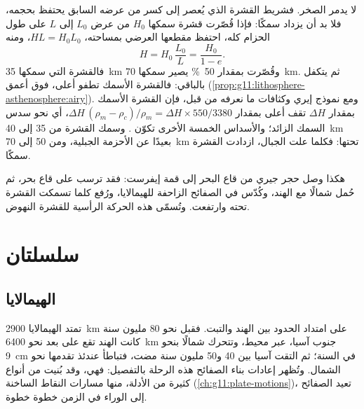  لا يدمر الصخر. فشريط القشرة الذي يُعصر إلى كسر من
عرضه السابق يحتفظ بحجمه، فلا بد أن يزداد سمكًا: فإذا قُصّرت قشرة
سمكها $H_0$ من عرض $L_0$ إلى $L$ على طول الحزام
كله، احتفظ مقطعها العرضي بمساحته، $H L = H_0 L_0$، ومنه
\[
  H = H_0\,\frac{L_0}{L} = \frac{H_0}{1 - e}.
\]
فالقشرة التي سمكها \qty{35}{km} وقُصّرت بمقدار \qty{50}{\percent} يصير
سمكها \qty{70}{km}. ثم يتكفل  بالباقي: فالقشرة الأسمك تطفو
أعلى، فوق  أعمق (\cref{prop:g11:lithosphere-asthenosphere:airy}).
ومع نموذج إيري وكثافات ما نعرفه من قبل، فإن القشرة الأسمك بمقدار
$\Delta H$ تقف أعلى بمقدار $\Delta H\,(\rho_m - \rho_c)/\rho_m = \Delta H
\times 550/3380$، أي نحو سدس السمك الزائد؛ والأسداس الخمسة
الأخرى تكوّن . وسمك القشرة من \num{35} إلى \qty{40}{km} بعيدًا عن
الأحزمة الجبلية، ومن 50 إلى \qty{70}{km} تحتها: فكلما علت
الجبال، ازدادت القشرة سمكًا.

هكذا وصل حجر جيري من قاع البحر إلى قمة إيفرست: فقد ترسب على
قاع بحر، ثم حُمل شمالًا مع الهند، وكُدّس في الصفائح
الزاحفة للهيمالايا، ورُفع كلما تسمكت القشرة تحته
وارتفعت. وتُسمّى هذه الحركة الرأسية للقشرة النهوض.

\section{سلسلتان}

\subsection{الهيمالايا}

تمتد الهيمالايا \qty{2900}{km} على امتداد الحدود بين الهند
والتبت. فقبل نحو 80 مليون سنة كانت الهند تقع على بعد نحو \qty{6400}{km} جنوب
آسيا، عبر محيط، وتتحرك شمالًا بنحو \qty{9}{cm} في السنة؛ ثم التقت
آسيا بين 40 و50 مليون سنة مضت، فتباطأ عندئذ تقدمها نحو الشمال.
وتُظهر إعادات بناء الصفائح هذه الرحلة بالتفصيل: فهي، وقد بُنيت من أنواع كثيرة
من الأدلة، منها مسارات النقاط الساخنة
(\cref{ch:g11:plate-motions})، تعيد الصفائح إلى الوراء في الزمن خطوة
خطوة.

